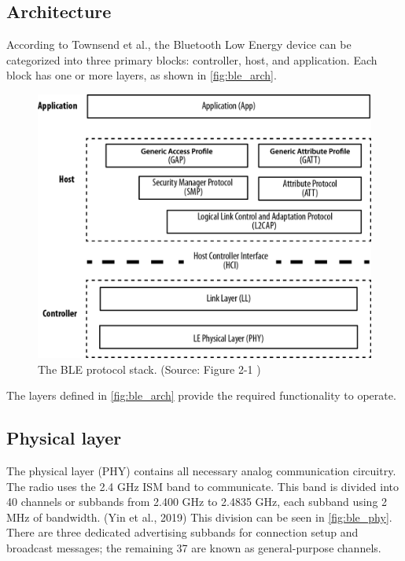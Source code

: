\subsection{Architecture}
\label{ble:ow}

According to Townsend et al., the Bluetooth Low Energy device can be categorized into
three primary blocks: controller, host, and application.
Each block has one or more layers, as shown in \autoref{fig:ble_arch}.

\begin{figure}[!ht]
    \centering
    \includegraphics[width=150mm, keepaspectratio]{figures/ble_arch_from_townsend.png}
    \caption{The BLE protocol stack. (Source: Figure 2-1 \cite{Townsend14})}
    \label{fig:ble_arch}
\end{figure}

The layers defined in \autoref{fig:ble_arch} provide the required functionality to operate.

\subsection{Physical layer}
\label{ble:phy}

The physical layer (PHY) contains all necessary analog communication circuitry.
The radio uses the 2.4 GHz ISM band to communicate.
This band is divided into 40 channels or subbands from 2.400 GHz to 2.4835 GHz,
each subband using 2 MHz of bandwidth. (Yin et al., 2019)
This division can be seen in \autoref{fig:ble_phy}.
There are three dedicated advertising subbands for connection setup and
broadcast messages; the remaining 37 are known as general-purpose channels.

